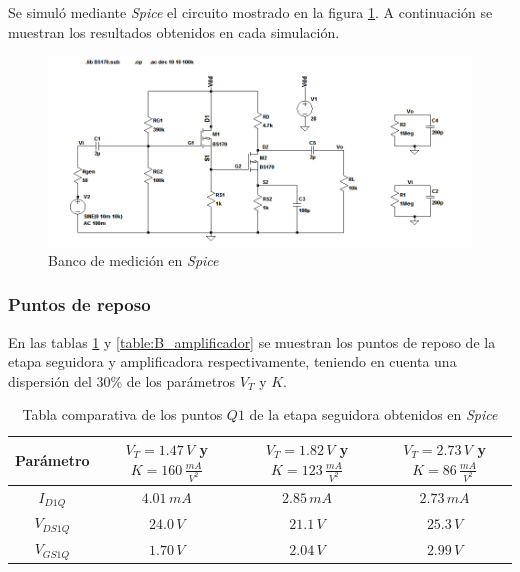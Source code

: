 \documentclass[10pt,spanish,a4paper,notitlepage]{article}
\begin{document}
Se simuló mediante \emph{Spice} el circuito mostrado en la figura \ref{fig:ByA_circuito_spice}.
A continuación se muestran los resultados obtenidos en cada simulación.

\begin{figure}[H]
\centering
\includegraphics[scale=0.65]{circuitos/B_circuito_Av.png}
\caption{Banco de medición en \emph{Spice}}
\label{fig:ByA_circuito_spice}
\end{figure}

\subsubsection{Puntos de reposo}

En las tablas \ref{table:B_seguidor} y \ref{table:B_amplificador} se muestran los puntos 
de reposo de la etapa seguidora y amplificadora respectivamente, teniendo en cuenta una dispersión del 30\% de los parámetros $V_T$ y $K$.


\begin{table}[H]
\centering
\begin{tabular}{|c|c|c|c|} 
\hline
Parámetro & $V_{T}=1.47\,\unit{V}$ y $K=160\,\unit{\frac{mA}{V^2}}$ & 
$V_{T}=1.82\,\unit{V}$ y $K=123\,\unit{\frac{mA}{V^2}}$ &
$V_{T}=2.73\,\unit{V}$ y $K=86\,\unit{\frac{mA}{V^2}}$ \\ \hline
$I_{D1Q}$ & $4.01\,\unit{mA}$ & $2.85\,\unit{mA}$ & $2.73\,\unit{mA}$\\ \hline
$V_{DS1Q}$ & $24.0\,\unit{V}$ & $21.1\,\unit{V}$ & $25.3\,\unit{V}$\\ \hline
$V_{GS1Q}$ & $1.70\,\unit{V}$  & $2.04\,\unit{V}$ & $2.99\,\unit{V}$\\ \hline
\end{tabular}
\caption{Tabla comparativa de los puntos $Q1$ de la etapa seguidora obtenidos en \emph{Spice}}
\label{table:B_seguidor}
\end{table}
\end{document}
